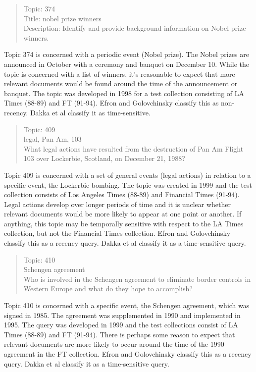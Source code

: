 \documentclass{sig-alternate}
\begin{document}
\begin{quote}
Topic: 374 \\
Title: nobel prize winners \\
Description:  Identify and provide background information on Nobel prize winners. \\
\end{quote}

Topic 374 is concerned with a periodic event (Nobel prize). The Nobel prizes are announced in October with a ceremony and banquet on December 10. While the topic is concerned with a list of winners, it's reasonable to expect that more relevant documents would be found around the time of the announcement or banquet. The topic was developed in 1998 for a test collection consisting of LA Times (88-89) and FT (91-94). Efron and Golovchinsky classify this as non-recency. Dakka et al classify it as time-sensitive.

\begin{quote}
Topic: 409	\\
legal, Pan Am, 103 \\
What legal actions have resulted from the destruction of Pan Am Flight 103 over Lockerbie, Scotland, on December 21, 1988?  \\
\end{quote}

Topic 409 is concerned with a set of general events (legal actions) in relation to a specific event, the Lockerbie bombing. The topic was created in 1999 and the test collection consists of Los Angeles Times (88-89) and Financial Times (91-94). Legal actions develop over longer periods of time and it is unclear whether relevant documents would be more likely to appear at one point or another.  If anything, this topic may be temporally sensitive with respect to the LA Times collection, but not the Financial Times collection. Efron and Golovchinsky classify this as a recency query. Dakka et al classify it as a time-sensitive query.

\begin{quote}
Topic: 410 \\
Schengen agreement \\
Who is involved in the Schengen agreement to eliminate border controls in Western Europe and what do they hope to accomplish? \\
\end{quote}

Topic 410 is concerned with a specific event, the Schengen agreement, which was signed in 1985.  The agreement was supplemented in 1990 and implemented in 1995. The query was developed in 1999 and the test collections consist of LA Times (88-89) and FT (91-94).  There is perhaps some reason to expect that relevant documents are more likely to occur around the time of the 1990 agreement in the FT collection.  Efron and Golovchinsky classify this as a recency query. Dakka et al classify it as a time-sensitive query.
\end{document}
